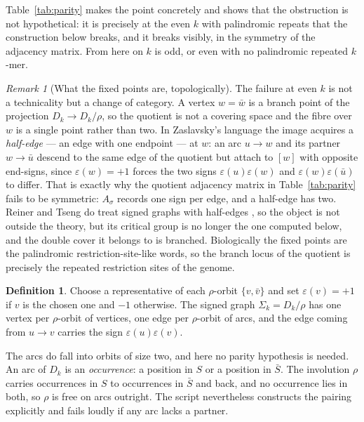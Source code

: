 \documentclass[11pt]{article}
\theoremstyle{plain}
\theoremstyle{definition}
\newtheorem{definition}[theorem]{Definition}
\theoremstyle{remark}
\newtheorem{remark}[theorem]{Remark}
\newcommand{\Sig}{\Sigma}
\begin{document}
Table~\ref{tab:parity} makes the point concretely and shows that the obstruction is not
hypothetical: it is precisely at the even $k$ with palindromic repeats that the construction
below breaks, and it breaks visibly, in the symmetry of the adjacency matrix. From here on
$k$ is odd, or even with no palindromic repeated $k$-mer.

\begin{remark}[What the fixed points are, topologically]\label{rem:halfedge}
The failure at even $k$ is not a technicality but a change of category. A vertex $w=\bar w$
is a branch point of the projection $D_k\to D_k/\rho$, so the quotient is not a covering
space and the fibre over $w$ is a single point rather than two. In Zaslavsky's language the
image acquires a \emph{half-edge} --- an edge with one endpoint --- at $w$: an arc $u\to w$
and its partner $w\to\bar u$ descend to the same edge of the quotient but attach to $[w]$
with opposite end-signs, since $\varepsilon(w)=+1$ forces the two signs
$\varepsilon(u)\varepsilon(w)$ and $\varepsilon(w)\varepsilon(\bar u)$ to differ. That is
exactly why the quotient adjacency matrix in Table~\ref{tab:parity} fails to be symmetric:
$A_\sigma$ records one sign per edge, and a half-edge has two. Reiner and Tseng do treat
signed graphs with half-edges \cite[\S9]{RT14}, so the object is not outside the theory, but
its critical group is no longer the one computed below, and the double cover it belongs to is
branched. Biologically the fixed points are the palindromic restriction-site-like words, so
the branch locus of the quotient is precisely the repeated restriction sites of the genome.
\end{remark}

\begin{definition}\label{def:sigma}
Choose a representative of each $\rho$-orbit $\{v,\bar v\}$ and set $\varepsilon(v)=+1$ if
$v$ is the chosen one and $-1$ otherwise. The signed graph $\Sig_k=D_k/\rho$ has one vertex
per $\rho$-orbit of vertices, one edge per $\rho$-orbit of arcs, and the edge coming from
$u\to v$ carries the sign $\varepsilon(u)\varepsilon(v)$.
\end{definition}

The arcs do fall into orbits of size two, and here no parity hypothesis is needed. An arc of
$D_k$ is an \emph{occurrence}: a position in $S$ or a position in $\bar S$. The involution
$\rho$ carries occurrences in $S$ to occurrences in $\bar S$ and back, and no occurrence lies
in both, so $\rho$ is free on arcs outright. The script nevertheless constructs the pairing
explicitly and fails loudly if any arc lacks a partner.
\end{document}
